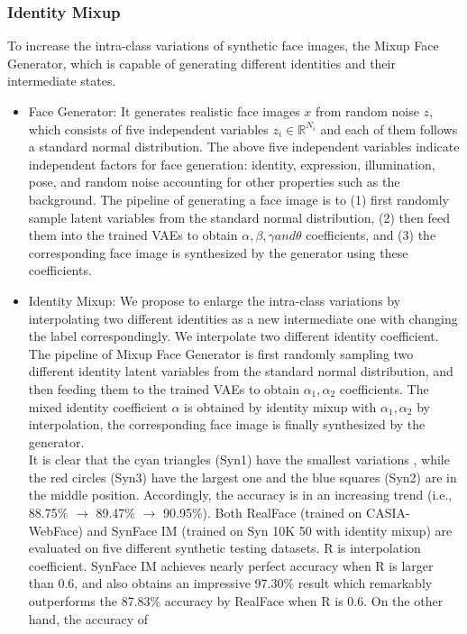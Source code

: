 \documentclass[12pt]{article}
\begin{document}
\subsubsection{Identity Mixup}
To increase the intra-class variations of synthetic face
images, the Mixup Face Generator, which is capable of generating different identities and their intermediate states. 
\begin{itemize}
  \item Face Generator: It generates realistic face images $x$ from random noise $z$,
  which consists of five independent variables $z_i\in \mathbb{R}^{N_i}$ and
  each of them follows a standard normal distribution. The
  above five independent variables indicate independent factors for face generation: identity, expression, illumination,
  pose, and random noise accounting for other properties such
  as the background. The pipeline of
  generating a face image is to (1) first randomly sample latent variables from the standard normal distribution, (2) then
  feed them into the trained VAEs to obtain $\alpha, \beta, \gamma and \theta$ coefficients, and (3) the corresponding face image is synthesized
  by the generator using these coefficients.
  \item Identity Mixup: We propose to enlarge the intra-class variations by interpolating two different identities as a new intermediate one with changing the label correspondingly. We interpolate two different identity coefficient.\\
  The pipeline of Mixup Face
  Generator is first randomly sampling two different identity
  latent variables from the standard normal distribution, and
  then feeding them to the trained VAEs to obtain $\alpha_1,\alpha_2$ coefficients. The mixed identity coefficient $\alpha$ is obtained by
  identity mixup with $\alpha_1,\alpha_2$ by interpolation, the corresponding face image is finally synthesized by the generator.\\
  It is clear
  that the cyan triangles (Syn1) have the smallest variations
  , while the red circles (Syn3) have the largest one and the
  blue squares (Syn2) are in the middle position. Accordingly, the accuracy is in an increasing trend (i.e., 88.75\% $\rightarrow$
  89.47\% $\rightarrow$ 90.95\%). Both RealFace (trained on CASIA-WebFace) and SynFace IM (trained on Syn 10K 50 with identity mixup) are
  evaluated on five different synthetic testing datasets. R is interpolation coefficient. SynFace IM achieves nearly perfect accuracy when R is larger
  than 0.6, and also obtains an impressive 97.30\% result which remarkably outperforms the 87.83\% accuracy by RealFace when R is 0.6. On the other hand, the accuracy of

\end{itemize}
\end{document}
